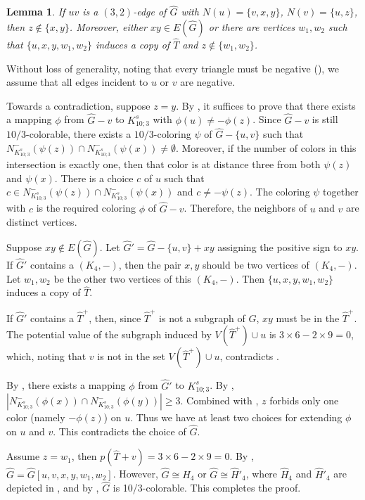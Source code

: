 \documentclass[11pt,a4paper]{article}
\makeatletter
\renewenvironment{proof}[1][\proofname]{\par
	\pushQED{\qed}%
	\normalfont \topsep6\p@\@plus6\p@\relax
	\trivlist
	\item[\hskip\labelsep
	\bfseries
	#1\@addpunct{.}]\ignorespaces
}{%
	\popQED\endtrivlist\@endpefalse
}
\newtheorem{lemma}[theorem]{Lemma}
\theoremstyle{definition}
\makeatother
\begin{document}
\begin{lemma}\label{lem:3_vertex_neighbors}
	If $uv$ is a $(3,2)$-edge of $\widehat{G}$ with $N(u)=\{v,x,y\}$, $N(v)=\{u,z\}$, then $z\notin \{x,y\}$. Moreover, either $xy\in E(\widehat{G})$ or there are vertices $w_1,w_2$ such that  $\{u, x, y, w_1, w_2\}$ induces a copy of $\widehat{T}$ and $z\notin \{w_1, w_2\}$.
\end{lemma}

\begin{proof}
	Without loss of generality, noting that every triangle must be negative (), we assume that all edges incident to  $u$ or $v$ are negative. 
	
	Towards a contradiction, suppose $z=y$.  By , it suffices to prove that there exists a mapping $\phi$ from $\widehat{G}-v$ to $K_{10;3}^s$ with $\phi(u)\neq -\phi(z)$. Since $\widehat{G}-v$ is still $10/3$-colorable, there exists a $10/3$-coloring $\psi$ of $\widehat{G}-\{u, v\}$ such that $N^-_{K_{10;3}^s}(\psi(z))\cap N^-_{K_{10;3}^s}(\psi(x))\neq \emptyset$. Moreover, if the number of  colors in this intersection is exactly one, then that color is at distance three from both $\psi(z)$ and $\psi(x)$. There is a choice $c$ of $u$ such that $c\in N^-_{K_{10;3}^s}(\psi(z))\cap N^-_{K_{10;3}^s}(\psi(x))$ and $c \neq -\psi(z)$. The coloring $\psi$ together with $c$ is the required coloring $\phi$ of $\widehat{G}-v$. Therefore, the neighbors of $u$ and $v$ are distinct vertices. 
	
	
	Suppose $xy\notin E(\widehat{G})$. Let $\widehat{G}'=\widehat{G}-\{u,v\}+xy$ assigning the positive sign to $xy$. If $\widehat{G}'$ contains a $(K_4,-)$, then the pair $x, y$ should be two vertices of $(K_4,-)$. Let $w_1,w_2$ be the other two vertices of this $(K_4,-)$. Then $\{u, x, y, w_1, w_2\}$ induces a copy of $\widehat{T}$.
	
	If $\widehat{G}'$ contains a $\widehat{T}^+$, then, since $\widehat{T}^+$  is not a subgraph of $G$, $xy$ must be in the $\widehat{T}^+$. The potential value of the subgraph induced by $V(\widehat{T}^+)\cup u$ is $3\times 6 -2\times 9=0$, which, noting that $v$ is not in the set $V(\widehat{T}^+)\cup u$, contradicts .
	
	By , there exists a mapping $\phi$ from $\widehat{G}'$ to $K_{10;3}^s$. By , $|N^-_{K_{10;3}^s}(\phi(x))\cap N^-_{K_{10;3}^s}(\phi(y))|\ge 3$. Combined with , $z$ forbids only one color (namely $-\phi(z)$) on $u$. Thus we have at least two choices for extending $\phi$ on $u$ and $v$. This contradicts the choice of $\widehat{G}$.
	
	Assume $z=w_1$, then $p(\widehat{T}+v)=3\times 6-2\times9=0$. By , $\widehat{G}=\widehat{G}[u,v,x,y,w_1,w_2]$. However, $\widehat{G}\cong \widehat{H}_4$ or $\widehat{G}\cong \widehat{H}'_4$, where $\widehat{H}_4$ and $\widehat{H}'_4$ are depicted in , and by , $\widehat{G}$ is 10/3-colorable. This completes the proof.
\end{proof}
\end{document}
